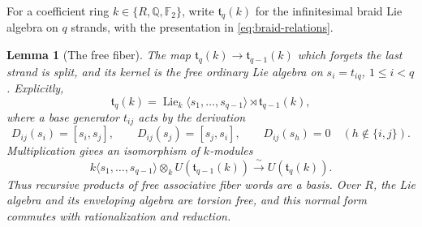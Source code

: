 \documentclass[11pt]{article}
\newtheorem{lemma}[theorem]{Lemma}
\theoremstyle{definition}
\theoremstyle{remark}
\numberwithin{equation}{section}
\begin{document}
For a coefficient ring \(k\in\{R,\mathbb Q,{\mathbb F_2}\}\), write
\(\mathfrak t_q(k)\) for the infinitesimal braid Lie algebra on
\(q\) strands, with the presentation in \eqref{eq:braid-relations}.

\begin{lemma}[The free fiber]\label{lem:free-fiber}
The map \(\mathfrak t_q(k)\longrightarrow\mathfrak t_{q-1}(k)\)
which forgets the last strand is split, and its kernel is the free
ordinary Lie algebra on \(s_i=t_{iq}\), \(1\leq i<q\).  Explicitly,
\begin{equation}\label{eq:free-fiber}
 \mathfrak t_q(k)
  =\operatorname{Lie}_k\langle s_1,\ldots,s_{q-1}\rangle
        \rtimes\mathfrak t_{q-1}(k),
\end{equation}
where a base generator \(t_{ij}\) acts by the derivation
\begin{equation}\label{eq:free-fiber-action}
 D_{ij}(s_i)=[s_i,s_j],\qquad
 D_{ij}(s_j)=[s_j,s_i],\qquad
 D_{ij}(s_h)=0\quad(h\notin\{i,j\}).
\end{equation}
Multiplication gives an isomorphism of \(k\)-modules
\begin{equation}\label{eq:enveloping-fiber}
 k\langle s_1,\ldots,s_{q-1}\rangle
       \otimes_k U(\mathfrak t_{q-1}(k))
       \xrightarrow{\ \sim\ }U(\mathfrak t_q(k)).
\end{equation}
Thus recursive products of free associative fiber words are a basis.
Over \(R\), the Lie algebra and its enveloping algebra are torsion
free, and this normal form commutes with rationalization and reduction.
\end{lemma}
\end{document}
